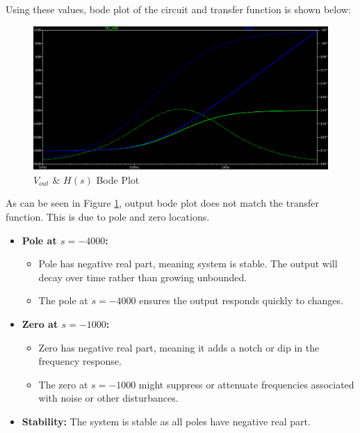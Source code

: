 \newpage
\thispagestyle{plain}

Using these values, bode plot of the circuit and transfer function is shown below:

\begin{figure}[h]
    \centering
    \includegraphics[width=1\textwidth]{assets/opamp-out-q.png}
    \caption{$V_{out}$ \& $H(s)$ Bode Plot}
    \label{fig:op_amp_v_out_bode_plot}
\end{figure}

As can be seen in Figure \ref{fig:op_amp_v_out_bode_plot}, output bode plot does not match the transfer function. This is due to pole and zero locations.

\begin{itemize}
    \item \textbf{Pole at $s=-4000$:}
        \begin{itemize}
            \item Pole has negative real part, meaning system is stable. The output will decay over time rather than growing unbounded.
            \item The pole at $s=-4000$ ensures the output responds quickly to changes.
        \end{itemize}
    \item \textbf{Zero at $s=-1000$:} 
        \begin{itemize}
            \item Zero has negative real part, meaning it adds a notch or dip in the frequency response.
            \item The zero at $s=-1000$ might suppress or attenuate frequencies associated with noise or other disturbances.
        \end{itemize}
    \item \textbf{Stability:} The system is stable as all poles have negative real part.
\end{itemize}

